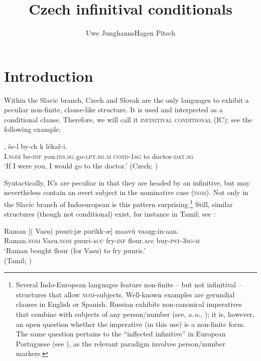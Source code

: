 \documentclass[output=paper,colorlinks,citecolor=brown,
modfonts,newtxmath
]{langscibook}
\title{Czech infinitival conditionals}
\author{%
 Uwe Junghanns\affiliation{University of Göttingen}\lastand Hagen Pitsch\affiliation{University of Göttingen}
}
\begin{document}
\maketitle

\section{Introduction}

Within the Slavic branch, Czech and Slovak are the only languages to exhibit a peculiar non-finite, clause-like structure. It is used and interpreted as a conditional clause. Therefore, we will call it \textsc{infinitival conditional} (IC); see the following example:

\ea\label{ex:start}
, še-l by-ch k lékař-i.\\ 
     {} I.\textsc{nom} be-\textsc{inf} you.\textsc{ins.sg} go-\textsc{lpt.sg.m} \textsc{cond-1sg} to doctor-\textsc{dat.sg}\\ 
\glt `If I were you, I would go to the doctor.' \hfill (Czech; \citealt[683]{Travnicek1951})
\z

\noindent Syntactically, ICs are peculiar in that they are headed by an infinitive, but may nevertheless contain an overt subject in the nominative case (\textsc{nom}). Not only in the Slavic branch of Indoeuropean is this pattern surprising.\footnote{Several Indo-European languages feature non-finite -- but not infinitival -- structures that allow \textsc{nom}-subjects. Well-known examples are gerundial clauses in English or Spanish. Russian exhibits non-canonical imperatives that combine with subjects of any person/number (see, a.\,o., \citealt{Xrakovskij2009}); it is, however, an open question whether the imperative (in this use) is a non-finite form. The same question pertains to the ``inflected infinitive'' in European Portuguese (see \citealt{Raposo1987}), as the relevant paradigm involves person/number markers.} Still, similar structures (though not conditional) exist, for instance in Tamil; see :

\ea\label{ex:Tamil}
\gll Raman {[(}\hspace{-2pt} Vasu) {puuri-jæ} {porikk-æ}] maav\u{u} vaaŋg-in-aan.\\
	Raman.\textsc{nom} {} Vasu.\textsc{nom} puuri-\textsc{acc} fry-\textsc{inf} flour.{\textsc acc} buy-\textsc{pst-3sg-m}\\ 
\glt `Raman bought flour (for Vasu) to fry puuris.' \\ \hfill (Tamil; \citealt[467]{McFaddenSundaresan2018})
\z
\end{document}
